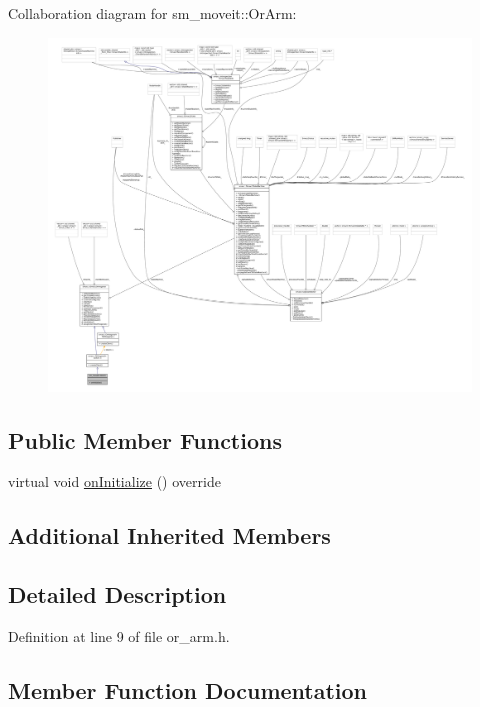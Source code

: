 Collaboration diagram for sm\+\_\+moveit\+:\+:Or\+Arm\+:
\nopagebreak
\begin{figure}[H]
\begin{center}
\leavevmode
\includegraphics[width=350pt]{classsm__moveit_1_1OrArm__coll__graph}
\end{center}
\end{figure}
\subsection*{Public Member Functions}
\begin{DoxyCompactItemize}
\item 
virtual void \hyperlink{classsm__moveit_1_1OrArm_a995fc310fe7cacbf78f45d98d1d96627}{on\+Initialize} () override
\end{DoxyCompactItemize}
\subsection*{Additional Inherited Members}


\subsection{Detailed Description}


Definition at line 9 of file or\+\_\+arm.\+h.



\subsection{Member Function Documentation}
